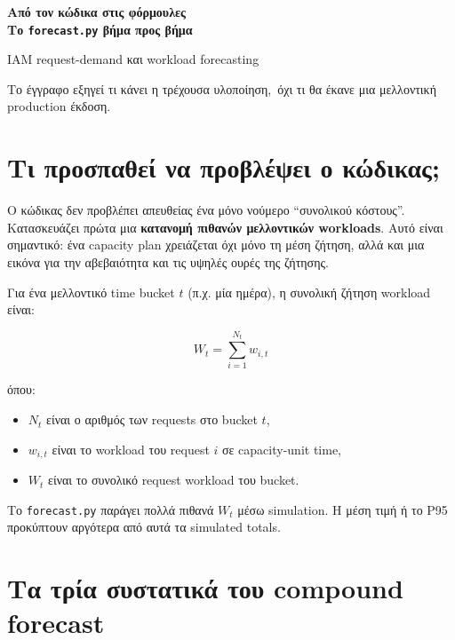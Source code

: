 \documentclass[11pt,a4paper]{article}
\newcommand{\equationnote}[1]{
  \begin{center}
    \colorbox{boxblue}{\parbox{0.92\linewidth}{\begin{equation*}#1\end{equation*}}}
  \end{center}
}
\newcommand{\code}[1]{\texttt{#1}}
\begin{document}
\begin{titlepage}
  \centering
  \vspace*{28mm}
  {\Huge\bfseries\color{navy} Από τον κώδικα στις φόρμουλες\\[4mm]
  \Large Το \code{forecast.py} βήμα προς βήμα\par}
  \vspace{10mm}
  {\large\color{muted} IAM request-demand και workload forecasting\par}
  \vspace{18mm}
  \vfill
  {\color{muted} Το έγγραφο εξηγεί τι κάνει η τρέχουσα υλοποίηση,\
  όχι τι θα έκανε μια μελλοντική production έκδοση.\par}
\end{titlepage}

\tableofcontents
\newpage

\section{Τι προσπαθεί να προβλέψει ο κώδικας;}

Ο κώδικας δεν προβλέπει απευθείας ένα μόνο νούμερο ``συνολικού κόστους''.
Κατασκευάζει πρώτα μια \textbf{κατανομή πιθανών μελλοντικών workloads}. Αυτό
είναι σημαντικό: ένα capacity plan χρειάζεται όχι μόνο τη μέση ζήτηση, αλλά
και μια εικόνα για την αβεβαιότητα και τις υψηλές ουρές της ζήτησης.

Για ένα μελλοντικό time bucket $t$ (π.χ. μία ημέρα), η συνολική ζήτηση
workload είναι:

\equationnote{W_t = \sum_{i=1}^{N_t} w_{i,t}}

όπου:
\begin{itemize}
  \item $N_t$ είναι ο αριθμός των requests στο bucket $t$,
  \item $w_{i,t}$ είναι το workload του request $i$ σε capacity-unit time,
  \item $W_t$ είναι το συνολικό request workload του bucket.
\end{itemize}

Το \code{forecast.py} παράγει πολλά πιθανά $W_t$ μέσω simulation. Η μέση
τιμή ή το P95 προκύπτουν αργότερα από αυτά τα simulated totals.

\section{Τα τρία συστατικά του compound forecast}
\end{document}
